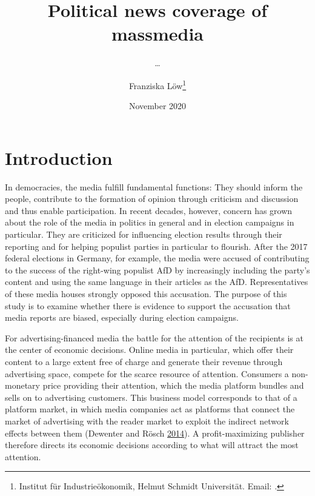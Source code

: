 \documentclass[
]{article}
\title{Political news coverage of massmedia}
\subtitle{\ldots{}}
\author{Franziska Löw\footnote{Institut für Industrieökonomik, Helmut Schmidt
  Universität. Email: .}}
\date{November 2020}
\begin{document}
\maketitle

\hypertarget{introduction}{%
\section{Introduction}\label{introduction}}

In democracies, the media fulfill fundamental functions: They should
inform the people, contribute to the formation of opinion through
criticism and discussion and thus enable participation. In recent
decades, however, concern has grown about the role of the media in
politics in general and in election campaigns in particular. They are
criticized for influencing election results through their reporting and
for helping populist parties in particular to flourish. After the 2017
federal elections in Germany, for example, the media were accused of
contributing to the success of the right-wing populist AfD by
increasingly including the party's content and using the same language
in their articles as the AfD. Representatives of these media houses
strongly opposed this accusation. The purpose of this study is to
examine whether there is evidence to support the accusation that media
reports are biased, especially during election campaigns.

For advertising-financed media the battle for the attention of the
recipients is at the center of economic decisions. Online media in
particular, which offer their content to a large extent free of charge
and generate their revenue through advertising space, compete for the
scarce resource of attention. Consumers a non-monetary price providing
their attention, which the media platform bundles and sells on to
advertising customers. This business model corresponds to that of a
platform market, in which media companies act as platforms that connect
the market of advertising with the reader market to exploit the indirect
network effects between them (Dewenter and Rösch
\protect\hyperlink{ref-dewenter_einfuhrung_2014}{2014}). A
profit-maximizing publisher therefore directs its economic decisions
according to what will attract the most attention.
\end{document}
